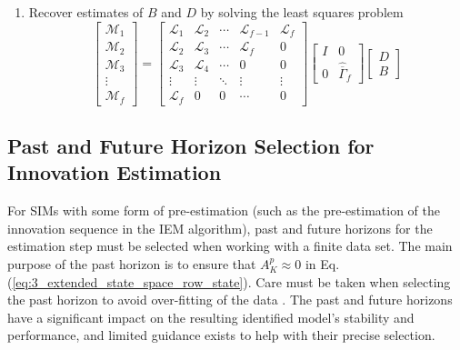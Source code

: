 \begin{table}[!htb]
{\begin{minipage}{5.5in}
\begin{enumerate}
\item Recover estimates of $B$ and $D$ by solving the least squares problem
\begin{equation*}
\begin{bmatrix}\mathcal{M}_1\\ \mathcal{M}_2\\ \mathcal{M}_3\\ \vdots\\ \mathcal{M}_f\end{bmatrix} = 
\begin{bmatrix}
\mathcal{L}_1 & \mathcal{L}_2 & \cdots & \mathcal{L}_{f-1} & \mathcal{L}_f\\
\mathcal{L}_2 & \mathcal{L}_3 & \cdots & \mathcal{L}_{f} & 0\\
\mathcal{L}_3 & \mathcal{L}_4 & \cdots & 0 & 0\\
\vdots & \vdots & \ddots & \vdots & \vdots\\
\mathcal{L}_f & 0 & 0 & \cdots & 0
\end{bmatrix}
\begin{bmatrix}I & 0\\ 0 & \hat{\overline{\Gamma}}_f\end{bmatrix}
\begin{bmatrix}D \\ B\end{bmatrix}
\end{equation*}
\end{enumerate}
\end{minipage}}
\label{iem_overview}
\end{table}


\subsection{Past and Future Horizon Selection for Innovation Estimation}\label{sec:past_and_future_horizon_selection}
For SIMs with some form of pre-estimation (such as the pre-estimation of the innovation sequence in the IEM algorithm), past and future horizons for the estimation step must be selected when working with a finite data set. The main purpose of the past horizon is to ensure that $A_K^p \approx 0$ in Eq. (\ref{eq:3_extended_state_space_row_state}). Care must be taken when selecting the past horizon to avoid over-fitting of the data \cite{van2013closed}. The past and future horizons have a significant impact on the resulting identified model's stability and performance, and limited guidance exists to help with their precise selection. 

